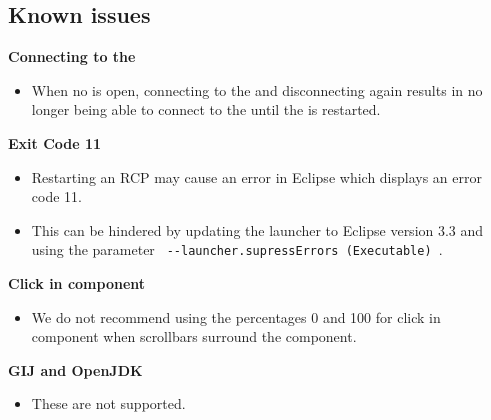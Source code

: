 \subsection{Known issues}

\textbf{Connecting to the \gdagent{}}
\begin{itemize}
\item When no \gdproject{} is open, connecting to the \gdagent{} and disconnecting again results in no longer being able to connect to the \gdagent{} until the \ite{} is restarted. 
\end{itemize}

\textbf{Exit Code 11}
\begin{itemize}
\item Restarting an RCP \gdaut{} may cause an error in Eclipse which displays an error code 11. 
\item This can be hindered by updating the launcher to Eclipse version 3.3 and using the parameter \verb+ --launcher.supressErrors (Executable) +. 
\end{itemize}

\textbf{Click in component}
\begin{itemize}
\item We do not recommend using the percentages 0 and 100 for click in component when scrollbars surround the component. 
\end{itemize}

\textbf{GIJ and OpenJDK}
\begin{itemize}
\item These are not supported. 
\end{itemize}
